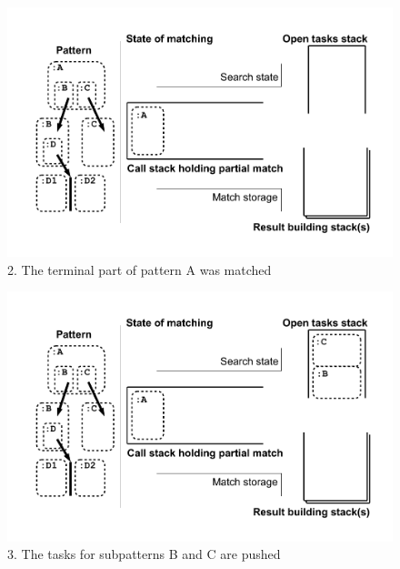 \begin{figure}[htbp]
  \centering
  \includegraphics[width=\textwidth]{fig/Passungszustand2}
  \caption{2. The terminal part of pattern A was matched}
  \label{figmatchingstate2}
\end{figure}

\begin{figure}[htbp]
  \centering
  \includegraphics[width=\textwidth]{fig/Passungszustand3}
  \caption{3. The tasks for subpatterns B and C are pushed}
  \label{figmatchingstate3}
\end{figure}

